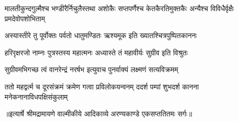 \threelineshloka
{मालतीकुन्दगुल्मैश्च भण्डीरैर्निचुलैस्तथा}
{अशोकैः सप्तपर्णैश्च केतकैरतिमुक्तकैः}
{अन्यैश्च विविधैर्वृक्षैः प्रमदेवोपशोभिताम्} %

\twolineshloka
{अस्यास्तीरे तु पूर्वोक्तः पर्वतो धातुमण्डितः}
{ऋश्यमूक इति ख्यातश्चित्रपुष्पितकाननः} %

\twolineshloka
{हरिरृक्षरजो नाम्नः पुत्रस्तस्य महात्मनः}
{अध्यास्ते तं महावीर्यः सुग्रीव इति विश्रुतः} %

\twolineshloka
{सुग्रीवमभिगच्छ त्वं वानरेन्द्रं नरर्षभ}
{इत्युवाच पुनर्वाक्यं लक्ष्मणं सत्यविक्रमम्} %

\fourlineindentedshloka
{ततो महद्वर्त्म च दूरसंक्रमं}
{ क्रमेण गत्वा प्रविलोकयन्वनम्}
{ददर्श पम्पां शुभदर्श कानना}
{मनेकनानाविधपक्षिसंकुलाम्} %


{॥इत्यार्षे श्रीमद्रामायणे वाल्मीकीये आदिकाव्ये अरण्यकाण्डे एकसप्ततितमः सर्गः॥}

